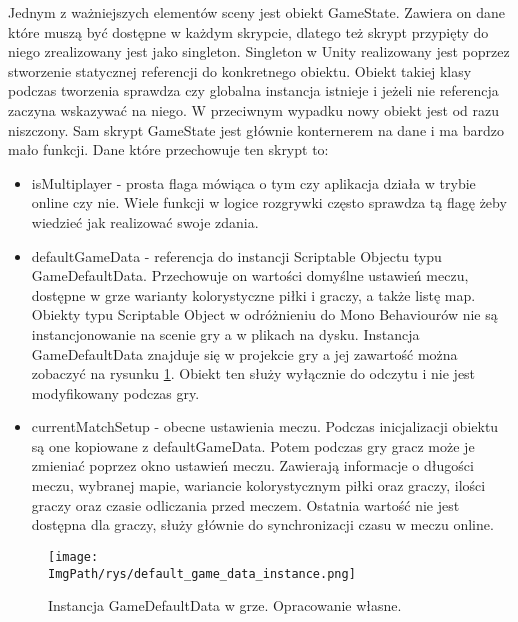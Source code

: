 \documentclass[a4paper,12pt,twoside,openany]{report}
\newcommand{\ImgPath}{.}
\begin{document}
Jednym z ważniejszych elementów sceny jest obiekt GameState. Zawiera on dane które muszą być dostępne w każdym skrypcie, dlatego też skrypt przypięty do niego zrealizowany jest jako singleton. Singleton w Unity realizowany jest poprzez stworzenie statycznej referencji do konkretnego obiektu. Obiekt takiej klasy podczas tworzenia sprawdza czy globalna instancja istnieje i jeżeli nie referencja zaczyna wskazywać na niego. W przeciwnym wypadku nowy obiekt jest od razu niszczony. Sam skrypt GameState jest głównie konternerem na dane i ma bardzo mało funkcji. Dane które przechowuje ten skrypt to:
\begin{itemize}
    \item isMultiplayer - prosta flaga mówiąca  o tym czy aplikacja działa w trybie online czy nie. Wiele funkcji w logice rozgrywki często sprawdza tą flagę żeby wiedzieć jak realizować swoje zdania.
    \item defaultGameData - referencja do instancji Scriptable Objectu typu GameDefaultData. Przechowuje on wartości domyślne ustawień meczu, dostępne w grze warianty kolorystyczne piłki i graczy, a także listę map. Obiekty typu Scriptable Object w odróżnieniu do Mono Behaviourów nie są instancjonowanie na scenie gry a w plikach na dysku. Instancja GameDefaultData znajduje się w projekcie gry a jej zawartość można zobaczyć na rysunku  \ref{default_game_data_instance}. Obiekt ten służy wyłącznie do odczytu i nie jest modyfikowany podczas gry.
    \item currentMatchSetup - obecne ustawienia meczu. Podczas inicjalizacji obiektu są one kopiowane z defaultGameData. Potem podczas gry gracz może je zmieniać poprzez okno ustawień meczu. Zawierają informacje o długości meczu, wybranej mapie, wariancie kolorystycznym piłki oraz graczy, ilości graczy oraz czasie odliczania przed meczem. Ostatnia wartość nie jest dostępna dla graczy, służy głównie do synchronizacji czasu w meczu online.
\end{itemize}

\begin{figure}[H]
	\begin{center}
\centering
\texttt{[image: \\ImgPath/rys/default\_game\_data\_instance.png]}
\end{center}
	\caption{Instancja GameDefaultData w grze. Opracowanie własne.}
	\label{default_game_data_instance}
\end{figure}
\end{document}
